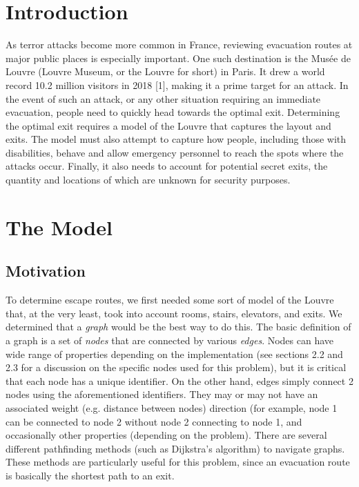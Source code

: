 \documentclass[12pt]{article}
\begin{document}
\section{Introduction}
As terror attacks become more common in France, reviewing evacuation routes at major public places is especially important. One such destination is the Mus\'ee de Louvre (Louvre Museum, or the Louvre for short) in Paris. It drew a world record 10.2 million visitors in 2018 [1], making it a prime target for an attack. In the event of such an attack, or any other situation requiring an immediate evacuation, people need to quickly head towards the optimal exit. Determining the optimal exit requires a model of the Louvre that captures the layout and exits. The model must also attempt to capture how people, including those with disabilities, behave and allow emergency personnel to reach the spots where the attacks occur. Finally, it also needs to account for potential secret exits, the quantity and locations of which are unknown for security purposes. 

\section{The Model}
\subsection{Motivation}
To determine escape routes, we first needed some sort of model of the Louvre that, at the very least, took into account rooms, stairs, elevators, and exits. We determined that a \textit{graph} would be the best way to do this. The basic definition of a graph is a set of \textit{nodes} that are connected by various \textit{edges}. Nodes can have wide range of properties depending on the implementation (see sections 2.2 and 2.3 for a discussion on the specific nodes used for this problem), but it is critical that each node has a unique identifier. On the other hand, edges simply connect 2 nodes using the aforementioned identifiers. They may or may not have an associated weight (e.g. distance between nodes) direction (for example, node 1 can be connected to node 2 without node 2 connecting to node 1, and occasionally other properties (depending on the problem). There are several different pathfinding methods (such as Dijkstra's algorithm) to navigate graphs. These methods are particularly useful for this problem, since an evacuation route is basically the shortest path to an exit.\\
\end{document}
